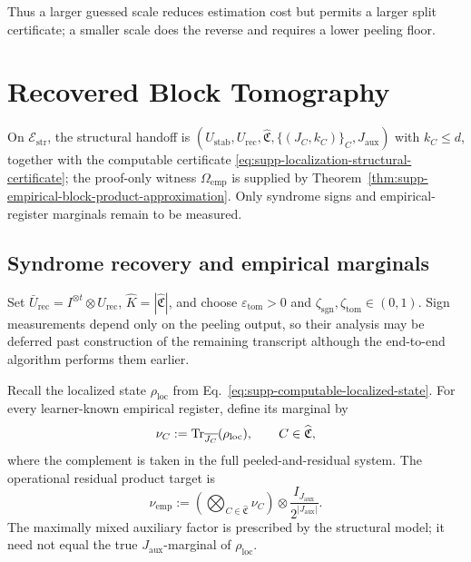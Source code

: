 \documentclass[
  aps,
  prx,
  reprint,
  superscriptaddress,
  amsmath,
  amssymb,
  nofootinbib,
  longbibliography
]{revtex4-2}
\begin{document}
Thus a larger guessed scale reduces estimation cost but permits a larger
split certificate; a smaller scale does the reverse and requires a lower
peeling floor.

\section{Recovered Block Tomography}
\label{sec:supp-block-tomography}
\label{sec:supp-deferred-syndrome-sign-recovery}

On $\mathcal E_{\mathrm{str}}$, the structural handoff is
$(U_{\mathrm{stab}},U_{\mathrm{rec}},\widehat{\mathfrak C},
\{(J_C,k_C)\}_C,J_{\mathrm{aux}})$ with $k_C\le d$, together with the
computable certificate
\eqref{eq:supp-localization-structural-certificate}; the proof-only witness
$\Omega_{\mathrm{emp}}$ is supplied by
Theorem~\ref{thm:supp-empirical-block-product-approximation}.  Only syndrome
signs and empirical-register marginals remain to be measured.

\subsection{Syndrome recovery and empirical marginals}

Set $\bar U_{\mathrm{rec}}=I^{\otimes t}\otimes U_{\mathrm{rec}}$,
$\widehat K=|\widehat{\mathfrak C}|$, and choose $\varepsilon_{\mathrm{tom}}>0$
and $\zeta_{\mathrm{sgn}},\zeta_{\mathrm{tom}}\in(0,1)$.  Sign measurements
depend only on the peeling output, so their
analysis may be deferred past construction of the remaining transcript
although the end-to-end algorithm performs them earlier.

Recall the localized state $\rho_{\mathrm{loc}}$ from
Eq.~\eqref{eq:supp-computable-localized-state}.  For every learner-known
empirical register, define its marginal by
\begin{equation}
\nu_C
:=
\Tr_{\overline{J_C}}(\rho_{\mathrm{loc}}),
\qquad
C\in\widehat{\mathfrak C},
\label{eq:supp-actual-empirical-marginals}
\end{equation}
where the complement is taken in the full peeled-and-residual system.
The operational residual product target is
\begin{equation}
\nu_{\mathrm{emp}}
:=
\left(
\bigotimes_{C\in\widehat{\mathfrak C}}\nu_C
\right)
\otimes
\frac{I_{J_{\mathrm{aux}}}}{2^{|J_{\mathrm{aux}}|}}.
\label{eq:supp-operational-empirical-product-target}
\end{equation}
The maximally mixed auxiliary factor is prescribed by the structural
model; it need not equal the true $J_{\mathrm{aux}}$-marginal of
$\rho_{\mathrm{loc}}$.
\end{document}
